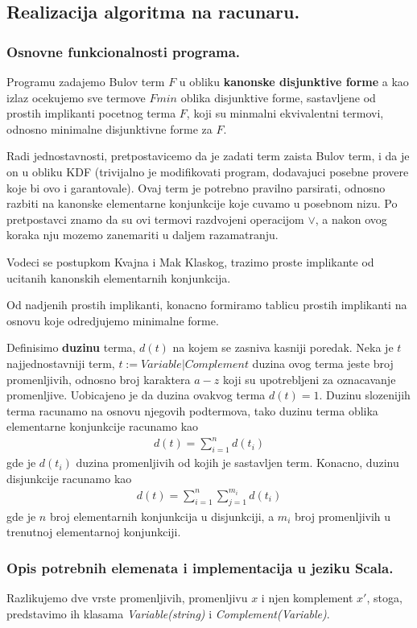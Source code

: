 \documentclass{article}
\begin{document}
\subsection{Realizacija algoritma na racunaru.}
\subsubsection{Osnovne funkcionalnosti programa.}
Programu zadajemo Bulov term $F$ u obliku \textbf{kanonske disjunktive forme} \cite{kdf} a kao izlaz ocekujemo sve termove $Fmin$ oblika disjunktive forme, sastavljene od prostih implikanti pocetnog terma $F$, koji su minmalni ekvivalentni termovi, odnosno minimalne disjunktivne forme za $F$.

Radi jednostavnosti, pretpostavicemo da je zadati term zaista Bulov term, i da je on u obliku KDF (trivijalno je modifikovati program, dodavajuci posebne provere koje bi ovo i garantovale). Ovaj term je potrebno pravilno parsirati, odnosno razbiti na kanonske elementarne konjunkcije koje cuvamo u posebnom nizu. Po pretpostavci znamo da su ovi termovi razdvojeni operacijom $\vee$, a nakon ovog koraka nju mozemo zanemariti u daljem razamatranju. 

Vodeci se postupkom Kvajna i Mak Klaskog, trazimo proste implikante od ucitanih kanonskih elementarnih konjunkcija. 

Od nadjenih prostih implikanti, konacno formiramo tablicu prostih implikanti na osnovu koje odredjujemo minimalne forme.

Definisimo \textbf{duzinu} terma, $d(t)$ na kojem se zasniva kasniji poredak. Neka je $t$ najjednostavniji term, $t := Variable | Complement$ duzina ovog terma jeste broj promenljivih, odnosno broj karaktera $a-z$ koji su upotrebljeni za oznacavanje promenljive. Uobicajeno je da duzina ovakvog terma $d(t) = 1$. Duzinu slozenijih terma racunamo na osnovu njegovih podtermova, tako duzinu terma oblika elementarne konjunkcije racunamo kao
\begin{align*}
d(t) = \sum_{i=1}^{n} d(t_i)
\end{align*}
gde je $d(t_i)$ duzina promenljivih od kojih je sastavljen term. Konacno, duzinu disjunkcije racunamo kao 
\begin{align*}
d(t) = \sum_{i=1}^{n} \sum_{j=1}^{m_i} d(t_i)
\end{align*}
gde je $n$ broj elementarnih konjunkcija u disjunkciji, a $m_i$ broj promenljivih u trenutnoj elementarnoj konjunkciji.

\subsubsection{Opis potrebnih elemenata i implementacija u jeziku Scala.}
Razlikujemo dve vrste promenljivih, promenljivu $x$ i njen komplement $x'$, stoga, predstavimo ih klasama \textit{Variable(string)} i \textit{Complement(Variable)}.
\end{document}

